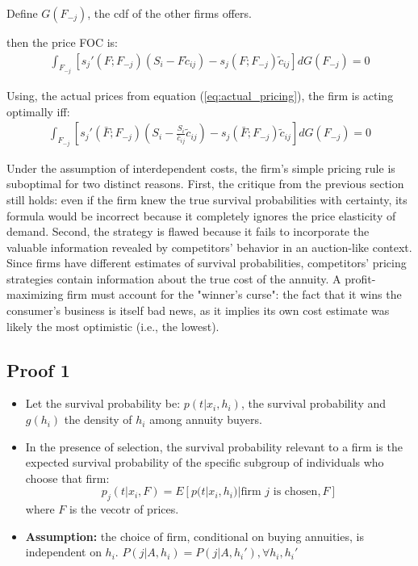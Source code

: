 \documentclass[12pt]{article}
\theoremstyle{plain}
\theoremstyle{plain}
\begin{document}
Define $G(F_{-j})$, the cdf of the other firms offers. 

then the price FOC is: 
\begin{align*}
    \int_{F_{-j}} \left[s_j'(F; F_{-j}) \left(S_{i}-F\tilde{c}_{ij}\right)- s_j(F; F_{-j}) \tilde{c}_{ij}  \right]dG(F_{-j})=0
\end{align*} 

Using, the actual prices from equation (\ref{eq:actual_pricing}), the firm is acting optimally iff: 
\begin{align}\label{eq:comparison2}
    \int_{F_{-j}} \left[s_j'(\bar{F}; F_{-j}) \left(S_{i}-\frac{S_{i}}{\bar{c}_{ij}}\tilde{c}_{ij}\right)- s_j(\bar{F}; F_{-j}) \tilde{c}_{ij}  \right]dG(F_{-j})=0
\end{align}   
 
 
Under the assumption of interdependent costs, the firm's simple pricing rule is suboptimal for two distinct reasons. First, the critique from the previous section still holds: even if the firm knew the true survival probabilities with certainty, its formula would be incorrect because it completely ignores the price elasticity of demand. Second, the strategy is flawed because it fails to incorporate the valuable information revealed by competitors' behavior in an auction-like context. Since firms have different estimates of survival probabilities, competitors' pricing strategies contain information about the true cost of the annuity. A profit-maximizing firm must account for the "winner's curse": the fact that it wins the consumer's business is itself bad news, as it implies its own cost estimate was likely the most optimistic (i.e., the lowest).  




\subsection{Proof 1}\label{sec:proof1}


\begin{itemize}
    \item Let the survival probability be: $p(t|x_i, h_i)$, the survival probability and $g(h_i)$ the density of $h_i$ among annuity buyers. 

    \item  In the presence of selection, the survival probability relevant to a firm is the expected survival probability of the specific subgroup of individuals who choose that firm: 
    \[
    p_j(t|x_i, F) = E[p(t|x_i, h_i) | \text{firm } j \text{ is chosen}, F]
    \]
    where $F$ is the vecotr of prices. 
    \item \textbf{Assumption: } the choice of firm, conditional on buying annuities, is independent on $h_i$. $P(j|A, h_i) = P(j|A, h_i'), \forall h_i, h_i' $
\end{itemize}
\end{document}
